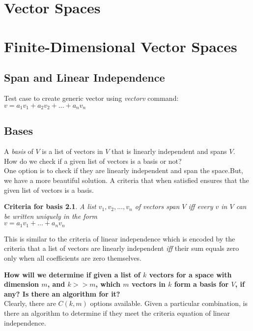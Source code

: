 \documentclass{report}
\begin{document}
\newcommand{\vectorv}{v = a_1v_1 + a_2v_2 + ... + a_nv_n}

\listoftodos


\chapter{Vector Spaces}

\chapter{Finite-Dimensional Vector Spaces}
\section{Span and Linear Independence}

Test case to create generic vector using \textit{vectorv} command: $\vectorv$

\section{Bases}

A \textit{basis} of $ V $ is a list of vectors in $V$ that is linearly independent and spans $V$. \\
How do we check if a given list of vectors is a basis or not?\\
One option is to check if they are linearly independent and span the space.But, we have a more beautiful solution. A criteria that when satisfied ensures that the given list of vectors is a basis.

\newtheorem{criteria-for-basis}{Criteria for basis}



\begin{criteria-for-basis}
	A list $ v_1, v_2, ..., v_n $ of vectors span $V$ iff every $v$ in $V$ can be written \textit{uniquely} in the form \\
	$ v = a_1v_1 + ... + a_nv_n$
\end{criteria-for-basis}

This is similar to the criteria of linear independence which is encoded by the criteria that a list of vectors are linearly independent \textit{iff} their sum equals zero only when all coefficients are zero themselves.

\textbf{How will we determine if given a list of $k$ vectors for a space with dimension $m$, and $k >> m$, which $m$ vectors in $k$ form a basis for $V$, if any? Is there an algorithm for it?}\\
Clearly, there are $C(k, m)$ options available. Given a particular combination, is there an algorithm to determine if they meet the criteria equation of linear independence. \\
\end{document}
